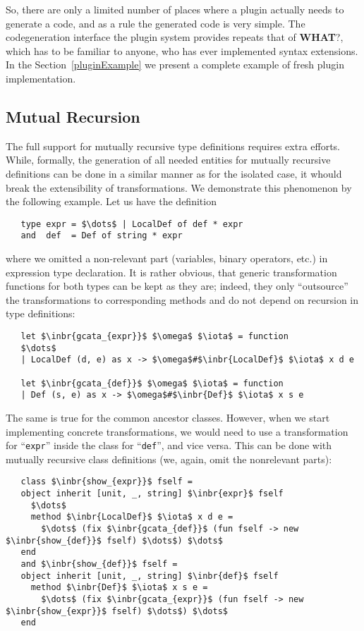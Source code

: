 So, there are only a limited number of places where a plugin actually needs to generate a code, and as a rule the generated code is very simple. The
codegeneration interface the plugin system provides repeats that of \textbf{WHAT}?, which has to be familiar to anyone, who has ever implemented
syntax extensions. In the Section~\ref{pluginExample} we present a complete example of fresh plugin implementation.

\subsection{Mutual Recursion}
\label{murec}

The full support for mutually recursive type definitions requires extra efforts. While, formally, the generation of all needed entities for
mutually recursive definitions can be done in a similar manner as for the isolated case, it whould break the extensibility of
transformations. We demonstrate this phenomenon by the following example. Let us have the definition

\begin{lstlisting}
   type expr = $\dots$ | LocalDef of def * expr
   and  def  = Def of string * expr
\end{lstlisting}

where we omitted a non-relevant part (variables, binary operators, etc.) in expression type declaration. It is rather obvious, that generic
transformation functions for both types can be kept as they are; indeed, they only ``outsource'' the transformations to corresponding
methods and do not depend on recursion in type definitions:

\begin{lstlisting}
   let $\inbr{gcata_{expr}}$ $\omega$ $\iota$ = function
   $\dots$
   | LocalDef (d, e) as x -> $\omega$#$\inbr{LocalDef}$ $\iota$ x d e

   let $\inbr{gcata_{def}}$ $\omega$ $\iota$ = function
   | Def (s, e) as x -> $\omega$#$\inbr{Def}$ $\iota$ x s e
\end{lstlisting}

The same is true for the common ancestor classes. However, when we start implementing concrete transformations, we would need to use a transformation
for ``\lstinline{expr}'' inside the class for ``\lstinline{def}'', and vice versa. This can be done with mutually recursive class definitions (we, again,
omit the nonrelevant parts):

\begin{lstlisting}
   class $\inbr{show_{expr}}$ fself =
   object inherit [unit, _, string] $\inbr{expr}$ fself
     $\dots$
     method $\inbr{LocalDef}$ $\iota$ x d e =
       $\dots$ (fix $\inbr{gcata_{def}}$ (fun fself -> new $\inbr{show_{def}}$ fself) $\dots$) $\dots$
   end
   and $\inbr{show_{def}}$ fself =
   object inherit [unit, _, string] $\inbr{def}$ fself
     method $\inbr{Def}$ $\iota$ x s e =
       $\dots$ (fix $\inbr{gcata_{expr}}$ (fun fself -> new $\inbr{show_{expr}}$ fself) $\dots$) $\dots$
   end
\end{lstlisting}

